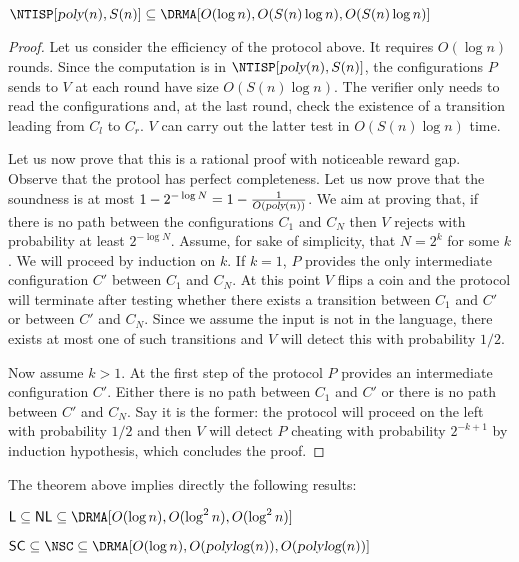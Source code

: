 \begin{theorem}
\label{thm:main}
$\NTISP[\poly(n), S(n)] \subseteq \DRMA[O(\log n), O(S(n)\log n), O(S(n)\log n)]$
\end{theorem}
\begin{proof}
Let us consider the efficiency of the protocol above.
It requires $O(\log n)$ rounds.
Since the computation is in $\NTISP[\poly(n), S(n)]$, the configurations $P$ sends to $V$ at each round have size $O(S(n) \log n)$.
The verifier only needs to read the configurations and, at the last round, check the existence of a transition leading from $C_l$ to $C_r$. $V$ can carry out the latter test in $O(S(n) \log n)$ time.

Let us now prove that this is a rational proof with noticeable reward gap.
Observe that the protool has perfect completeness. 
Let us now prove that the soundness is at most $1 - 2^{-\log N} = 1 - \frac{1}{O({\textsl{poly}}(n))}$.
We aim at proving that, if there is no path between the configurations $C_1$ and $C_N$ then $V$ rejects with probability at least $2^{-\log N}$.
Assume, for sake of simplicity, that $N = 2^k$ for some $k$. We will proceed by induction on $k$. If $k=1$, $P$ provides the only intermediate configuration $C'$ between $C_1$ and $C_N$. At this point $V$ flips a coin and the protocol will terminate after testing whether there exists a transition between $C_1$ and $C'$ or between $C'$ and $C_N$. Since we assume the input is not in the language, there exists at most one of such transitions and $V$ will detect this with probability $1/2$.

Now assume $k > 1$. At the first step of the protocol $P$ provides an intermediate configuration $C'$. Either there is no path between $C_1$ and $C'$ or there is no path between $C'$ and $C_N$. Say it is the former: the protocol will proceed on the left with probability $1/2$ and then $V$ will detect $P$ cheating with probability $2^{-k+1}$ by induction hypothesis, which concludes the proof.
\end{proof}

\medskip
\noindent
The theorem above implies directly the following results:

\begin{corollary}
$ \L \subseteq \NL \subseteq \DRMA[O(\log n), O(\log^2 n ), O(\log^2 n )]$
\end{corollary}


\begin{corollary}
$ \SC \subseteq  \NSC \subseteq \DRMA[O(\log n), O(\polylog(n)), O(\polylog(n))]$
\end{corollary}
